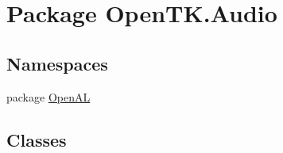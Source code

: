\hypertarget{namespace_open_t_k_1_1_audio}{\section{Package Open\-T\-K.\-Audio}
\label{namespace_open_t_k_1_1_audio}
}
\subsection*{Namespaces}
\begin{DoxyCompactItemize}
\item 
package \hyperlink{namespace_open_t_k_1_1_audio_1_1_open_a_l}{Open\-A\-L}
\end{DoxyCompactItemize}
\subsection*{Classes}
